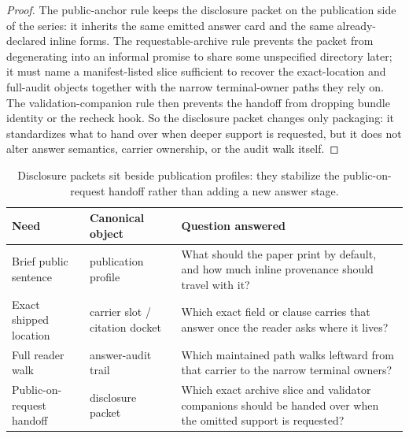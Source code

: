 \documentclass[11pt]{article}
\begin{document}
\begin{proof}
The public-anchor rule keeps the disclosure packet on the publication side of the series: it inherits the same emitted answer card and the same already-declared inline forms.
The requestable-archive rule prevents the packet from degenerating into an informal promise to share some unspecified directory later; it must name a manifest-listed slice sufficient to recover the exact-location and full-audit objects together with the narrow terminal-owner paths they rely on.
The validation-companion rule then prevents the handoff from dropping bundle identity or the recheck hook.
So the disclosure packet changes only packaging: it standardizes what to hand over when deeper support is requested, but it does not alter answer semantics, carrier ownership, or the audit walk itself.\qedhere
\end{proof}

\begin{table}[t]
\centering
\small
\begin{tabularx}{\linewidth}{@{}l l X@{}}
\toprule
Need & Canonical object & Question answered \\
\midrule
Brief public sentence & publication profile & What should the paper print by default, and how much inline provenance should travel with it? \\
Exact shipped location & carrier slot / citation docket & Which exact field or clause carries that answer once the reader asks where it lives? \\
Full reader walk & answer-audit trail & Which maintained path walks leftward from that carrier to the narrow terminal owners? \\
Public-on-request handoff & disclosure packet & Which exact archive slice and validator companions should be handed over when the omitted support is requested? \\
\bottomrule
\end{tabularx}
\caption{Disclosure packets sit beside publication profiles: they stabilize the public-on-request handoff rather than adding a new answer stage.}
\label{tab:answerdisclosurepackets}
\end{table}
\end{document}
